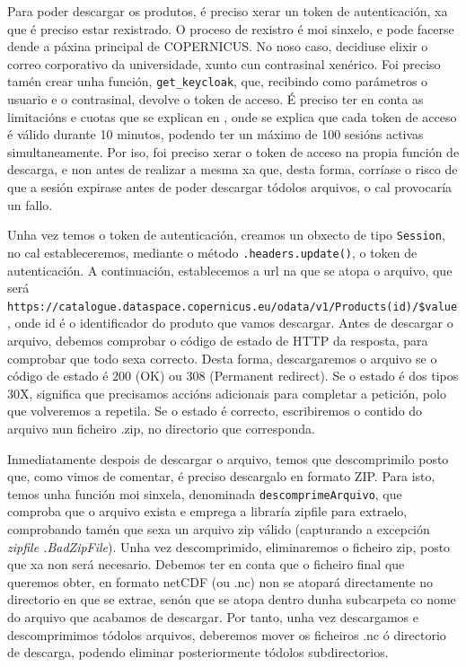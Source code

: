 Para poder descargar os produtos, é preciso xerar un token de autenticación, xa que é preciso estar rexistrado. O proceso de rexistro é moi sinxelo, e pode facerse dende a páxina principal de
COPERNICUS. No noso caso, decidiuse elixir o correo corporativo da universidade, xunto cun contrasinal xenérico. Foi preciso tamén crear unha función, \texttt{get\_keycloak}, que, recibindo como
parámetros o usuario e o contrasinal, devolve o token de acceso. É preciso ter en conta as limitacións e cuotas que se explican en \cite{copquotas}, onde se explica que cada token de acceso é válido
durante 10 minutos, podendo ter un máximo de 100 sesións activas simultaneamente. Por iso, foi preciso xerar o token de acceso na propia función de descarga, e non antes de realizar a mesma xa que,
desta forma, corríase o risco de que a sesión expirase antes de poder descargar tódolos arquivos, o cal provocaría un fallo.

Unha vez temos o token de autenticación, creamos un obxecto de tipo \texttt{Session}, no cal estableceremos, mediante o método \texttt{.headers.update()}, o token de autenticación. A continuación,
establecemos a url na que se atopa o arquivo, que será \texttt{https://catalogue.dataspace.copernicus.eu/odata/v1/Products({id})\break/\$value}, onde id é o identificador do produto que vamos
descargar. Antes de descargar o arquivo, debemos comprobar o código de estado de HTTP da resposta, para comprobar que todo sexa correcto. Desta forma, descargaremos o arquivo se o código de estado
é 200 (OK) ou 308 (Permanent redirect). Se o estado é dos tipos 30X, significa que precisamos accións adicionais para completar a petición, polo que volveremos a repetila. Se o estado é correcto,
escribiremos o contido do arquivo nun ficheiro .zip, no directorio que corresponda.

Inmediatamente despois de descargar o arquivo, temos que descomprimilo posto que, como vimos de comentar, é preciso descargalo en formato ZIP. Para isto, temos unha función moi sinxela, denominada
\texttt{descomprimeArquivo}, que comproba que o arquivo exista e emprega a libraría zipfile para extraelo, comprobando tamén que sexa un arquivo zip válido (capturando a excepción \textit{zipfile
.BadZipFile}). Unha vez descomprimido, eliminaremos o ficheiro zip, posto que xa non será necesario. Debemos ter en conta que o ficheiro final que queremos obter, en formato netCDF (ou .nc) non se
atopará directamente no directorio en que se extrae, senón que se atopa dentro dunha subcarpeta co nome do arquivo que acabamos de descargar. Por tanto, unha vez descargamos e descomprimimos
tódolos arquivos, deberemos mover os ficheiros .nc ó directorio de descarga, podendo eliminar posteriormente tódolos subdirectorios.


